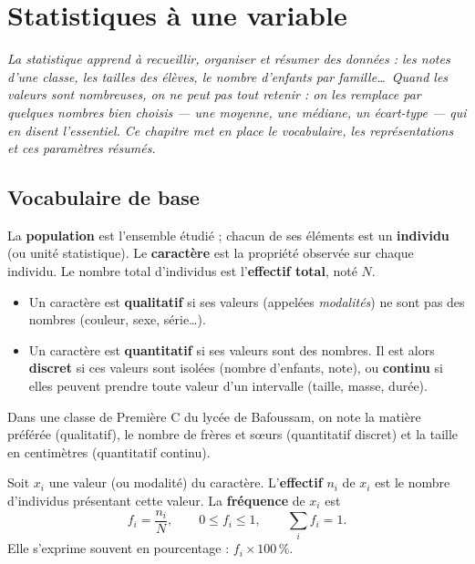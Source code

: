 \chapter{Statistiques à une variable}
\textit{La statistique apprend à recueillir, organiser et résumer des données : les
notes d'une classe, les tailles des élèves, le nombre d'enfants par famille\dots\
Quand les valeurs sont nombreuses, on ne peut pas tout retenir : on les remplace par
quelques nombres bien choisis — une \emph{moyenne}, une \emph{médiane}, un
\emph{écart-type} — qui en disent l'essentiel. Ce chapitre met en place le
vocabulaire, les représentations et ces paramètres résumés.}

\section{Vocabulaire de base}

\begin{definition}
La \textbf{population} est l'ensemble étudié ; chacun de ses éléments est un
\textbf{individu} (ou unité statistique). Le \textbf{caractère} est la propriété
observée sur chaque individu. Le nombre total d'individus est l'\textbf{effectif
total}, noté $N$.
\end{definition}

\begin{definition}
\begin{itemize}
  \item Un caractère est \textbf{qualitatif} si ses valeurs (appelées
        \emph{modalités}) ne sont pas des nombres (couleur, sexe, série\dots).
  \item Un caractère est \textbf{quantitatif} si ses valeurs sont des nombres. Il est
        alors \textbf{discret} si ces valeurs sont isolées (nombre d'enfants, note),
        ou \textbf{continu} si elles peuvent prendre toute valeur d'un intervalle
        (taille, masse, durée).
\end{itemize}
\end{definition}

\begin{exemple}
Dans une classe de Première C du lycée de Bafoussam, on note la matière préférée
(qualitatif), le nombre de frères et sœurs (quantitatif discret) et la taille en
centimètres (quantitatif continu).
\end{exemple}

\begin{definition}
Soit $x_i$ une valeur (ou modalité) du caractère. L'\textbf{effectif} $n_i$ de $x_i$
est le nombre d'individus présentant cette valeur. La \textbf{fréquence} de $x_i$ est
\[ f_i = \frac{n_i}{N}, \qquad 0\le f_i\le 1, \qquad \sum_i f_i = 1. \]
Elle s'exprime souvent en pourcentage : $f_i\times 100\,\%$.
\end{definition}

